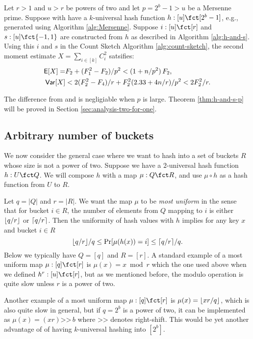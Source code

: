 \begin{theorem}\label{thm:h-and-s-p}
Let $r>1$ and $u>r$ be powers of two and let $p=2^b-1>u$ be a
Mersenne prime.
Suppose with have a $k$-universal hash function $h:[u]\fct[2^b-1]$, e.g.,
generated using Algorithm \ref{alg:Mersenne}. Suppose
$i:[u]\fct[r]$ and
$s:[u]\fct\{-1,1\}$ are constructed from $h$ as described in
Algorithm \ref{alg:h-and-s}. Using this $i$ and $s$ 
in the Count Sketch Algorithm \ref{alg:count-sketch}, the second moment 
estimate $X=\sum_{i\in[k]} C_i^2$ satsifies:
\begin{align}
\operatorname*{\sf{E}}[X]=&F_2+(F_1^2-F_2)/p^2 < (1+n/p^2)\,F_2\textnormal,\label{eq:E-F2-p}\\
{\sf Var}[X]&< 2(F_2^2-F_4)/r+F_2^2 (2.33+4 n/r)/p^2<2F_2^2/r.\label{eq:V-F2-p}
\end{align}
\end{theorem}
The difference from  and  
is negligiable when $p$ is large. Theorem \ref{thm:h-and-s-p} will be
proved in Section \ref{sec:analysis-two-for-one}.


\subsection{Arbitrary number of buckets}\label{sec:most-uniform}
We now consider the general case where we want to hash into a set of
buckets $R$ whose size is not a power of two. Suppose we have a
$2$-universal hash function $h:U\fct Q$. We will compose $h$ with a
map $\mu:Q\fct R$, and use $\mu\circ h$ as a hash function from
$U$ to $R$.

Let $q=|Q|$ and $r=|R|$. We want the map $\mu$ to be \emph{most
  uniform} in the sense that for bucket $i\in R$, the number of
elements from $Q$ mapping to $i$ is either $\lfloor {q/r} \rfloor$ or
$\lceil {q/r}\rceil$. Then the uniformity of hash values with $h$ implies for
any key $x$ and bucket $i\in R$
\[\lfloor {q/r} \rfloor/q\leq \Pr[\mu(
  h(x))=i]\leq \lceil {q/r}\rceil/q.\]
Below we typically have $Q=[q]$ and $R=[r]$. A standard example of a most uniform map $\mu:[q]\fct[r]$ 
is $\mu(x)=x\bmod r$ which the one used above when we defined 
$h^r:[u]\fct[r]$, but as we mentioned before, the modulo operation is 
quite slow unless $r$ is a power of two. 

Another example of a most uniform map $\mu:[q]\fct[r]$ 
is $\mu(x)=\lfloor {xr/q} \rfloor$,
which is also quite slow in general, but if $q=2^b$ is a power of two,
it can be implemented as $\mu(x)=(xr)\texttt{>>}\,b$ where 
$\texttt{>>}$ denotes right-shift. This would be yet another advantage 
of of having $k$-universal hashing into $[2^b]$. 

